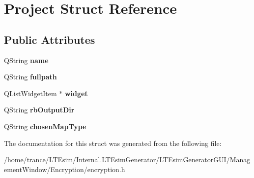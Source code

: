 \hypertarget{struct_project}{}\section{Project Struct Reference}
\label{struct_project}
\subsection*{Public Attributes}
\begin{DoxyCompactItemize}
\item 
Q\+String {\bfseries name}\hypertarget{struct_project_a82dd2d1bc38f9fd08c9a811fcaa76b38}{}\label{struct_project_a82dd2d1bc38f9fd08c9a811fcaa76b38}

\item 
Q\+String {\bfseries fullpath}\hypertarget{struct_project_ad37b53d844349e9bd31c31b729083b72}{}\label{struct_project_ad37b53d844349e9bd31c31b729083b72}

\item 
Q\+List\+Widget\+Item $\ast$ {\bfseries widget}\hypertarget{struct_project_a837c19b97d64b6920ba900a35e961b35}{}\label{struct_project_a837c19b97d64b6920ba900a35e961b35}

\item 
Q\+String {\bfseries rb\+Output\+Dir}\hypertarget{struct_project_a668c205c65cd545bc388b1af2f450335}{}\label{struct_project_a668c205c65cd545bc388b1af2f450335}

\item 
Q\+String {\bfseries chosen\+Map\+Type}\hypertarget{struct_project_a494f6cb1ea8a7d66075d2f830013c115}{}\label{struct_project_a494f6cb1ea8a7d66075d2f830013c115}

\end{DoxyCompactItemize}


The documentation for this struct was generated from the following file\+:\begin{DoxyCompactItemize}
\item 
/home/trance/\+L\+T\+Esim/\+Internal.\+L\+T\+Esim\+Generator/\+L\+T\+Esim\+Generator\+G\+U\+I/\+Management\+Window/\+Encryption/encryption.\+h\end{DoxyCompactItemize}
